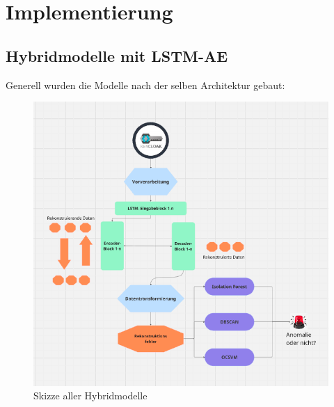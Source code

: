 \documentclass[a4paper,12pt]{article}
\begin{document}
	\section{Implementierung}
	\subsection{Hybridmodelle mit LSTM-AE}
	Generell wurden die Modelle nach der selben Architektur gebaut:
	
	\begin{figure}[H]
		\centering
		\includegraphics[width=0.9\linewidth]{Bilder/screenshot001}
		\caption{Skizze aller Hybridmodelle}
		\label{fig:screenshot001}
	\end{figure}
	
\end{document}
